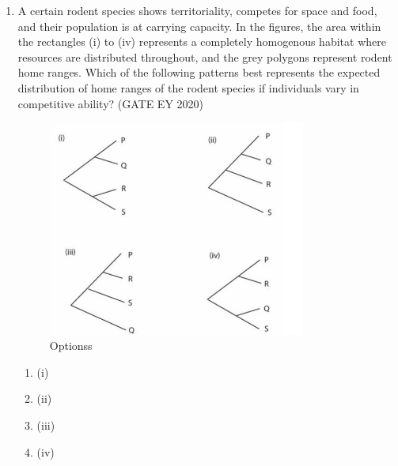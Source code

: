 \begin{enumerate}


\begin{multicols}{2}
\begin{enumerate}
\item P and Q have the same total diversity ($\gamma$) and P is more heterogeneous than Q.
\item Q has lower total diversity ($\gamma$) and is more heterogeneous than P.
\item P has greater total diversity ($\gamma$) and is more heterogeneous than Q.
\item Q has greater total diversity ($\gamma$) and is more heterogeneous than P.
\end{enumerate}
\end{multicols}
\item
A certain rodent species shows territoriality, competes for space and food, and their population is at carrying capacity. In the figures, the area within the rectangles (i) to (iv) represents a completely homogenous habitat where resources are distributed throughout, and the grey polygons represent rodent home ranges. Which of the following patterns best represents the expected distribution of home ranges of the rodent species if individuals vary in competitive ability? \hfill {(GATE EY 2020)}

\begin{center}
\begin{figure}[H]
    \includegraphics[width=0.8\textwidth]{figs/fig9.png}
\caption{Optionss}
\label{fig:q42}
\end{figure}
\end{center}

\begin{multicols}{2}
\begin{enumerate}
\item (i)
\item (ii)
\item (iii)
\item (iv)
\end{enumerate}
\end{multicols}


\end{enumerate}
